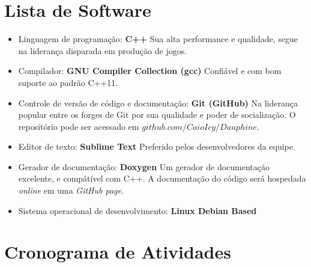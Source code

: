 \section{Lista de Software}
\begin{itemize}
\item{Linguagem de programação:} \textbf{C++}
Sua alta performance e qualidade, segue na liderança disparada em produção de jogos.
\item{Compilador:} \textbf{GNU Compiler Collection (gcc)}
Confiável e com bom suporte ao padrão C++11.
\item{Controle de versão de código e documentação:} \textbf{Git (GitHub)}
Na liderança popular entre os forges de Git por sua qualidade e poder de socialização. O repositório pode ser acessado em $github.com/CaioIcy/Dauphine$.
\item{Editor de texto:} \textbf{Sublime Text}
Preferido pelos desenvolvedores da equipe.
\item{Gerador de documentação:} \textbf{Doxygen}
Um gerador de documentação excelente, e compátível com C++. A documentação do código será hospedada \textit{online} em uma \textit{GitHub page}.
\item{Sistema operacional de desenvolvimento:} \textbf{Linux Debian Based}
\end{itemize}
\section{Cronograma de Atividades}
